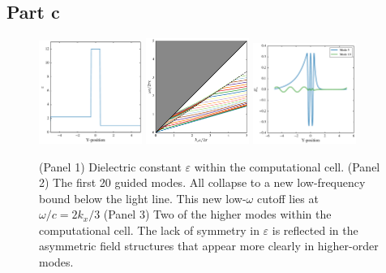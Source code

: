 \documentclass[aps,letterpaper,10pt]{article}
\begin{document}
\subsection{Part c}
\begin{figure}[!h]
\centering
\includegraphics[width=0.3\textwidth]{3c-1}
\includegraphics[width=0.3\textwidth]{3c-2}
\includegraphics[width=0.3\textwidth]{3c-3}
\caption{\label{fig:3c} (Panel 1) Dielectric constant $\varepsilon$ within the computational cell. (Panel 2) The first 20 guided modes. All collapse to a new low-frequency bound below the light line. This new low-$\omega$ cutoff lies at $\omega/c = 2k_x /3$   (Panel 3) Two of the higher modes within the computational cell. The lack of symmetry in $\varepsilon$ is reflected in the asymmetric field structures that appear more clearly in higher-order modes.}
\end{figure}
\end{document}
